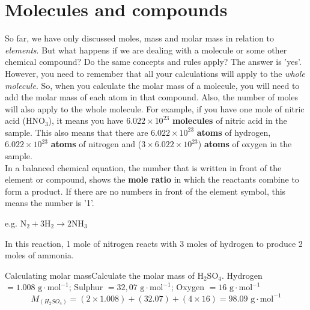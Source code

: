 



\section{Molecules and compounds}
\label{sec:quant:molecules}

So far, we have only discussed moles, mass and molar mass in relation to \textit{elements}. But what happens if we are dealing with a molecule or some other chemical compound? Do the same concepts and rules apply? The answer is 'yes'. However, you need to remember that all your calculations will apply to the \textit{whole molecule}. So, when you calculate the molar mass of a molecule, you will need to add the molar mass of each atom in that compound. Also, the number of moles will also apply to the whole molecule. For example, if you have one mole of nitric acid (HNO$_{3}$), it means you have $6.022 \times 10^{23}$ \textbf{molecules} of nitric acid in the sample. This also means that there are $6.022 \times 10^{23}$ \textbf{atoms} of hydrogen, $6.022 \times 10^{23}$ \textbf{atoms} of nitrogen and ($3 \times 6.022 \times 10^{23}$) \textbf{atoms} of oxygen in the sample. \\

In a balanced chemical equation, the number that is written in front of the element or compound, shows the \textbf{mole ratio} in which the reactants combine to form a product. If there are no numbers in front of the element symbol, this means the number is '1'.

\begin{center}
e.g. $\text{N}_{2} + 3\text{H}_{2} \rightarrow 2\text{NH}_{3}$
\end{center}

In this reaction, 1 mole of nitrogen reacts with 3 moles of hydrogen to produce 2 moles of ammonia.

\begin{wex}{Calculating molar mass}{Calculate the molar mass of H$_{2}$SO$_{4}$.}{
Hydrogen $= 1.008 \text{ g} \cdot \text{mol}^{-1}$; Sulphur $= 32,07 \text{ g} \cdot \text{mol}^{-1}$; Oxygen $= 16 \text{ g} \cdot \text{mol}^{-1}$
\begin{equation*}
M_{(H_{2}SO_{4})} = (2 \times 1.008) + (32.07) + (4 \times 16) = 98.09 \text{ g} \cdot \text{mol}^{-1}
\end{equation*}
}
\end{wex}

